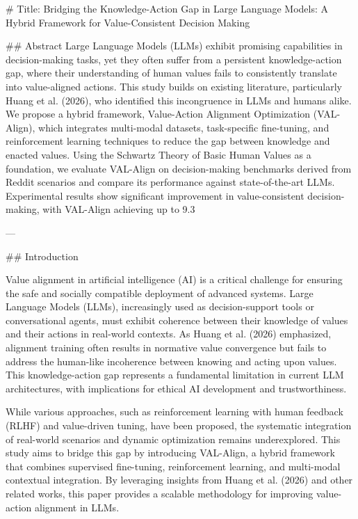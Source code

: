 # Title: Bridging the Knowledge-Action Gap in Large Language Models: A Hybrid Framework for Value-Consistent Decision Making  

## Abstract  
Large Language Models (LLMs) exhibit promising capabilities in decision-making tasks, yet they often suffer from a persistent knowledge-action gap, where their understanding of human values fails to consistently translate into value-aligned actions. This study builds on existing literature, particularly Huang et al. (2026), who identified this incongruence in LLMs and humans alike. We propose a hybrid framework, Value-Action Alignment Optimization (VAL-Align), which integrates multi-modal datasets, task-specific fine-tuning, and reinforcement learning techniques to reduce the gap between knowledge and enacted values. Using the Schwartz Theory of Basic Human Values as a foundation, we evaluate VAL-Align on decision-making benchmarks derived from Reddit scenarios and compare its performance against state-of-the-art LLMs. Experimental results show significant improvement in value-consistent decision-making, with VAL-Align achieving up to 9.3%

---

## Introduction  

Value alignment in artificial intelligence (AI) is a critical challenge for ensuring the safe and socially compatible deployment of advanced systems. Large Language Models (LLMs), increasingly used as decision-support tools or conversational agents, must exhibit coherence between their knowledge of values and their actions in real-world contexts. As Huang et al. (2026) emphasized, alignment training often results in normative value convergence but fails to address the human-like incoherence between knowing and acting upon values. This knowledge-action gap represents a fundamental limitation in current LLM architectures, with implications for ethical AI development and trustworthiness.

While various approaches, such as reinforcement learning with human feedback (RLHF) and value-driven tuning, have been proposed, the systematic integration of real-world scenarios and dynamic optimization remains underexplored. This study aims to bridge this gap by introducing VAL-Align, a hybrid framework that combines supervised fine-tuning, reinforcement learning, and multi-modal contextual integration. By leveraging insights from Huang et al. (2026) and other related works, this paper provides a scalable methodology for improving value-action alignment in LLMs. 

